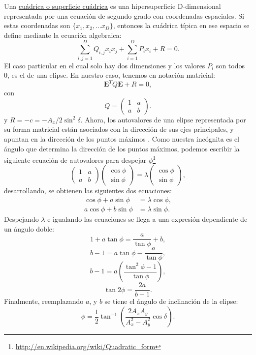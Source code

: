 Una \href{http://es.wikipedia.org/wiki/Cu\%C3\%A1drica}{cuádrica o
  superficie cuádrica} es una  hipersuperficie D-dimensional
representada por una ecuación de segundo grado con 
coordenadas espaciales. Si estas coordenadas son $\{x_1,
x_2, ... x_D\}$, entonces la cuádrica típica en ese espacio se define
mediante la ecuación algebraica: 
\[ \sum_{i,j=1}^D Q_{i,j} x_i x_j + \sum_{i=1}^D P_i x_i + R = 0. \]
El caso particular en el cual solo hay dos dimensiones y los valores
$P_i$ son todos 0, es el de una elipse. En nuestro caso, tenemos en
notación matricial:
\[ \mathbf{E}^TQ\mathbf{E} + R= 0, \]
con
\[
Q=
\begin{pmatrix}
1 & a\\
 a & b 
\end{pmatrix}.
 \]
y $R=-c = -A_x/2\sin^2{\delta}$. Ahora, los autovalores de una elipse
representada por su forma matricial están asociados con la
dirección de sus ejes principales, y apuntan en la dirección de los
puntos máximos . Como nuestra incógnita es el ángulo
que determina la dirección de los puntos máximos, podemos escribir la
siguiente ecuación de autovalores para despejar $\phi$\footnote{
\url{http://en.wikipedia.org/wiki/Quadratic_form}}
\[\begin{pmatrix}
1 & a\\
 a & b 
\end{pmatrix} 
\begin{pmatrix}
\cos{\phi}\\
 \sin{\phi} 
\end{pmatrix} =
\lambda \begin{pmatrix}
\cos{\phi}\\
 \sin{\phi} 
\end{pmatrix} ,
\]
desarrollando, se obtienen las siguientes dos ecuaciones:
\begin{align*}
\cos{\phi} +a\sin{\phi} &= \lambda\cos{\phi},\\
a\cos{\phi} +b\sin{\phi} &= \lambda\sin{\phi}.
\end{align*}
Despejando $\lambda$ e igualando las ecuaciones se llega a una
expresión dependiente de un ángulo doble:
\[1+a\tan{\phi} = \frac{a}{\tan{\phi}}+b,\]
\[b-1= a\tan{\phi} -\frac{a}{\tan{\phi}},\]
\[ b-1=a\left(\frac{\tan^2{\phi} -1}{\tan{\phi}}\right),\]
\[\tan{2\phi} =\frac{2a}{b-1}.\]
Finalmente, reemplazando $a$, y $b$ se tiene el ángulo de inclinación
de la elipse:
\begin{equation*}
\phi = \frac{1}{2}\tan^{-1}{\left(\frac{2A_xA_y}{A_x^2-A_y^2}\cos{\delta}\right)}.
\end{equation*}
